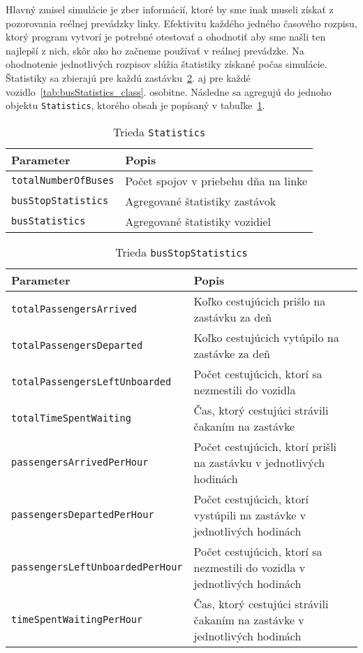 Hlavný zmisel simulácie je zber informácií, ktoré by sme inak museli získať z pozorovania reélnej prevádzky linky.
Efektivitu každého jedného časového rozpisu, ktorý program vytvorí je potrebné otestovať a ohodnotiť aby sme našli ten najlepší z nich, skôr ako ho začneme používať v reálnej prevádzke.
Na ohodnotenie jednotlivých rozpisov slúžia štatistiky získané počas simulácie.
Štatistiky sa zbierajú pre každú zastávku~\ref{tab:busStopStatistics_class}. aj pre každé vozidlo~\ref{tab:busStatistics_class}. osobitne.
Následne sa agregujú do jednoho objektu \texttt{Statistics}, ktorého obsah je popísaný v tabuľke~\ref{tab:statistics_class}.
\begin{table}[h]\label{tab:statistics_class}
  \centering
  \begin{tabularx}{\textwidth}{|l|X|}
    \hline
    \textbf{Parameter} & \textbf{Popis} \\ \hline
    \texttt{totalNumberOfBuses} & Počet spojov v priebehu dňa na linke \\ \hline
    \texttt{busStopStatistics} & Agregované štatistiky zastávok \\ \hline
    \texttt{busStatistics} & Agregované štatistiky vozidiel \\ \hline
  \end{tabularx}
  \caption{Trieda \texttt{Statistics}}
\end{table}

\begin{table}[h]\label{tab:busStopStatistics_class}
  \centering
  \begin{tabularx}{\textwidth}{|l|X|}
    \hline
    \textbf{Parameter} & \textbf{Popis} \\ \hline
    \texttt{totalPassengersArrived} & Koľko cestujúcich prišlo na zastávku za deň \\ \hline
    \texttt{totalPassengersDeparted} & Koľko cestujúcich vytúpilo na zastávke za deň \\ \hline
    \texttt{totalPassengersLeftUnboarded} & Počet cestujúcich, ktorí sa nezmestili do vozidla \\ \hline
    \texttt{totalTimeSpentWaiting} & Čas, ktorý cestujúci strávili čakaním na zastávke \\ \hline
    \texttt{passengersArrivedPerHour} & Počet cestujúcich, ktorí prišli na zastávku v jednotlivých hodinách \\ \hline
    \texttt{passengersDepartedPerHour} & Počet cestujúcich, ktorí vystúpili na zastávke v jednotlivých hodinách \\ \hline
    \texttt{passengersLeftUnboardedPerHour} & Počet cestujúcich, ktorí sa nezmestili do vozidla v jednotlivých hodinách \\ \hline
    \texttt{timeSpentWaitingPerHour} & Čas, ktorý cestujúci strávili čakaním na zastávke v jednotlivých hodinách \\ \hline
  \end{tabularx}
  \caption{Trieda \texttt{busStopStatistics}}
\end{table}

